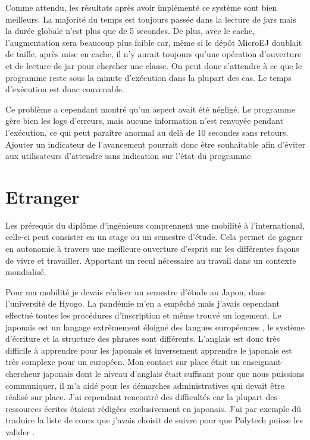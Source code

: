 \documentclass[french,a4paper,12pt]{report}
\begin{document}
Comme attendu, les résultats après avoir implémenté ce système sont bien meilleurs.
La majorité du temps est toujours passée dans la lecture de jars mais la durée globale n’est plus que de 5 secondes. De plus, avec le cache, l’augmentation sera beaucoup plus faible car, même si le dépôt MicroEJ doublait de taille, après mise en cache, il n’y aurait toujours qu’une opération d’ouverture et de lecture de jar pour chercher une classe. On peut donc s’attendre à ce que le programme reste sous la minute d’exécution dans la plupart des cas. Le temps d’exécution est donc convenable.

Ce problème a cependant montré qu'un aspect avait été négligé. Le programme gère bien les logs d’erreurs, mais aucune information n’est renvoyée pendant l’exécution, ce qui peut paraître anormal au delà de 10 secondes sans retours. Ajouter un indicateur de l’avancement pourrait donc être souhaitable afin d’éviter aux utilisateurs d’attendre sans indication sur l’état du programme.


\chapter{Etranger}

Les prérequis du diplôme d'ingénieurs comprennent une mobilité à l'international, celle-ci peut consister en un stage ou un semestre d'étude. Cela permet de gagner en autonomie à travers une meilleure ouverture d'esprit sur les différentes façons de vivre et travailler. Apportant un recul nécessaire au travail dans un contexte mondialisé. 


Pour ma mobilité je devais réaliser un semestre d'étude au Japon, dans l'université de Hyogo. La pandémie m’en a empêché mais j’avais cependant effectué toutes les procédures d’inscription et même trouvé un logement. Le japonais est un langage extrêmement éloigné des langues européennes , le système d’écriture et la structure des phrases sont différents. L’anglais est donc très difficile à apprendre pour les japonais et inversement apprendre le japonais est très complexe pour un européen.%
Mon contact sur place était un enseignant-chercheur japonais dont le niveau d’anglais était suffisant pour que nous puissions communiquer, il m’a aidé pour les démarches administratives qui devait être réalisé sur place. J’ai cependant rencontré des difficultés car la plupart des ressources écrites étaient rédigées exclusivement en japonais. J’ai par exemple dû traduire la liste de cours que j’avais choisit de suivre pour que Polytech puisse les valider .
\end{document}
